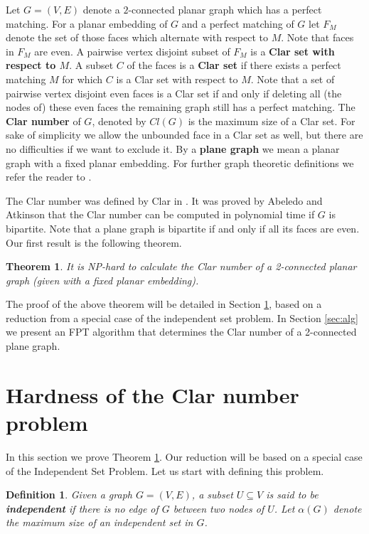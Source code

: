 \documentclass{article}
\newtheorem{theorem}{Theorem}
\newtheorem{defn}{Definition}
\begin{document}
Let $G=(V,E)$ denote a $2$-connected planar graph which has a perfect
matching. For a planar embedding of $G$ and a perfect matching of $G$
let $F_M$ denote the set of those faces which alternate with respect
to $M$. Note that faces in $F_M$ are even. A pairwise vertex disjoint
subset of $F_M$ is a \textbf{Clar set with respect to $M$}. A subset
$C$ of the faces is a \textbf{Clar set} if there exists a perfect
matching $M$ for which $C$ is a Clar set with respect to $M$.  Note
that a set of pairwise vertex disjoint even faces is a Clar set if and
only if deleting all (the nodes of) these even faces the remaining
graph still has a perfect matching. The \textbf{Clar number} of $G$,
denoted by $Cl(G)$ is the maximum size of a Clar set. For sake of
simplicity we allow the unbounded face in a Clar set as well, but
there are no difficulties if we want to exclude it. By a \textbf{
  plane graph} we mean a planar graph with a fixed planar embedding.
For further graph theoretic definitions we refer the reader to \cite{frank2011connections}.

The Clar number was defined by Clar in \cite{clar}. It was proved by
Abeledo and Atkinson \cite{abeledo_minmax} that the Clar number can be
computed in polynomial time if $G$ is bipartite. Note that a plane
graph is bipartite if and only if all its faces are even. 
Our first result is the following theorem.



\begin{theorem}\label{thm:nph}
It is NP-hard to calculate the Clar number of a 2-connected planar
graph (given with a fixed planar embedding).
\end{theorem}

{The proof of the above theorem will be detailed in Section
  \ref{sec:compl}, based on a reduction from a special case of the
  independent set problem.} In Section \ref{sec:alg} we present an FPT
algorithm that determines the Clar number of a 2-connected plane
graph.



\section{Hardness of the Clar number problem}
\label{sec:compl}

In this section we prove Theorem \ref{thm:nph}. Our reduction will be
based on a special case of the Independent Set Problem. Let us start
with defining this problem.


\begin{defn}
Given a graph $G=(V,E)$, a subset $U\subseteq V$ is said to be
\textbf{independent} if there is no edge of $G$ between two nodes of $U$.
Let $\alpha(G)$ denote the maximum size of an
independent set in $G$.
\end{defn}
\end{document}
